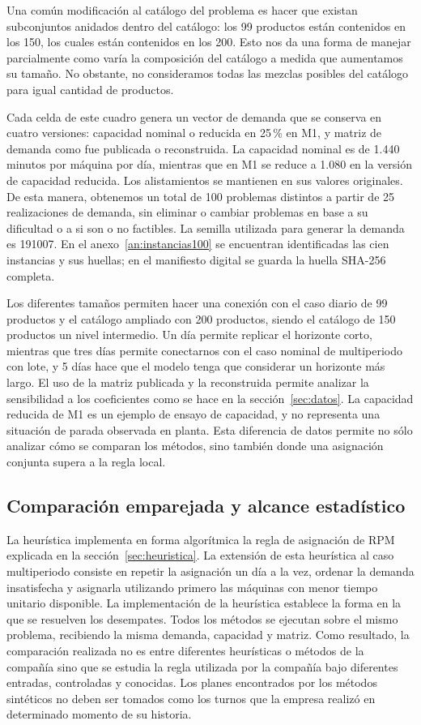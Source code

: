 Una común modificación al catálogo del problema es hacer que existan subconjuntos anidados dentro del catálogo: los 99 productos están contenidos en los 150, los cuales están contenidos en los 200. Esto nos da una forma de manejar parcialmente como varía la composición del catálogo a medida que aumentamos su tamaño. No obstante, no consideramos todas las mezclas posibles del catálogo para igual cantidad de productos.

Cada celda de este cuadro genera un vector de demanda que se conserva en cuatro versiones: capacidad nominal o reducida en 25\,\% en M1, y matriz de demanda como fue publicada o reconstruida. La capacidad nominal es de 1.440 minutos por máquina por día, mientras que en M1 se reduce a 1.080 en la versión de capacidad reducida. Los alistamientos se mantienen en sus valores originales. De esta manera, obtenemos un total de 100 problemas distintos a partir de 25 realizaciones de demanda, sin eliminar o cambiar problemas en base a su dificultad o a si son o no factibles. La semilla utilizada para generar la demanda es 191007. En el anexo~\ref{an:instancias100} se encuentran identificadas las cien instancias y sus huellas; en el manifiesto digital se guarda la huella SHA-256 completa.

Los diferentes tamaños permiten hacer una conexión con el caso diario de 99 productos y el catálogo ampliado con 200 productos, siendo el catálogo de 150 productos un nivel intermedio. Un día permite replicar el horizonte corto, mientras que tres días permite conectarnos con el caso nominal de multiperiodo con lote, y 5 días hace que el modelo tenga que considerar un horizonte más largo. El uso de la matriz publicada y la reconstruida permite analizar la sensibilidad a los coeficientes como se hace en la sección~\ref{sec:datos}. La capacidad reducida de M1 es un ejemplo de ensayo de capacidad, y no representa una situación de parada observada en planta. Esta diferencia de datos permite no sólo analizar cómo se comparan los métodos, sino también donde una asignación conjunta supera a la regla local.

\subsection{Comparación emparejada y alcance estadístico}
La heurística implementa en forma algorítmica la regla de asignación de RPM explicada en la sección~\ref{sec:heuristica}. La extensión de esta heurística al caso multiperiodo consiste en repetir la asignación un día a la vez, ordenar la demanda insatisfecha y asignarla utilizando primero las máquinas con menor tiempo unitario disponible. La implementación de la heurística establece la forma en la que se resuelven los desempates. Todos los métodos se ejecutan sobre el mismo problema, recibiendo la misma demanda, capacidad y matriz. Como resultado, la comparación realizada no es entre diferentes heurísticas o métodos de la compañía sino que se estudia la regla utilizada por la compañía bajo diferentes entradas, controladas y conocidas. Los planes encontrados por los métodos sintéticos no deben ser tomados como los turnos que la empresa realizó en determinado momento de su historia.

